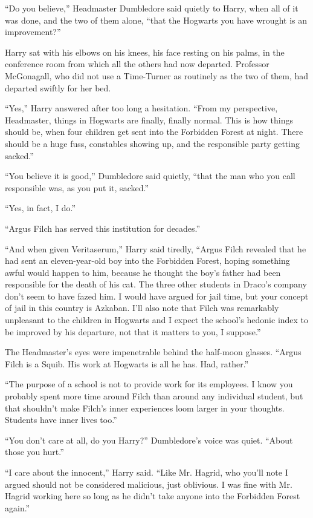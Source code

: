 ``Do you believe,'' Headmaster Dumbledore said quietly to Harry, when
all of it was done, and the two of them alone, ``that the Hogwarts you
have wrought is an improvement?''

Harry sat with his elbows on his knees, his face resting on his palms,
in the conference room from which all the others had now departed.
Professor McGonagall, who did not use a Time-Turner as routinely as the
two of them, had departed swiftly for her bed.

``Yes,'' Harry answered after too long a hesitation. ``From my
perspective, Headmaster, things in Hogwarts are finally, finally normal.
This is how things should be, when four children get sent into the
Forbidden Forest at night. There should be a huge fuss, constables
showing up, and the responsible party getting sacked.''

``You believe it is good,'' Dumbledore said quietly, ``that the man who
you call responsible was, as you put it, sacked.''

``Yes, in fact, I do.''

``Argus Filch has served this institution for decades.''

``And when given Veritaserum,'' Harry said tiredly, ``Argus Filch
revealed that he had sent an eleven-year-old boy into the Forbidden
Forest, hoping something awful would happen to him, because he thought
the boy's father had been responsible for the death of his cat. The
three other students in Draco's company don't seem to have fazed him. I
would have argued for jail time, but your concept of jail in this
country is Azkaban. I'll also note that Filch was remarkably unpleasant
to the children in Hogwarts and I expect the school's hedonic index to
be improved by his departure, not that it matters to you, I suppose.''

The Headmaster's eyes were impenetrable behind the half-moon glasses.
``Argus Filch is a Squib. His work at Hogwarts is all he has. Had,
rather.''

``The purpose of a school is not to provide work for its employees. I
know you probably spent more time around Filch than around any
individual student, but that shouldn't make Filch's inner experiences
loom larger in your thoughts. Students have inner lives too.''

``You don't care at all, do you Harry?'' Dumbledore's voice was quiet.
``About those you hurt.''

``I care about the innocent,'' Harry said. ``Like Mr. Hagrid, who you'll
note I argued should not be considered malicious, just oblivious. I was
fine with Mr. Hagrid working here so long as he didn't take anyone into
the Forbidden Forest again.''

